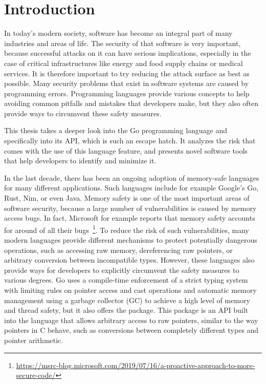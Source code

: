 
\chapter{Introduction}\label{ch:introduction}

In today's modern society, software has become an integral part of many industries and areas of life.
The security of that software is very important, because successful attacks on it can have serious implications,
especially in the case of critical infrastructures like energy and food supply chains or medical services.
It is therefore important to try reducing the attack surface as best as possible.
Many security problems that exist in software systems are caused by programming errors.
Programming languages provide various concepts to help avoiding common pitfalls and mistakes that developers make, but
they also often provide ways to circumvent these safety measures.

This thesis takes a deeper look into the Go programming language and specifically into its \unsafe{} \acrshort{API},
which is such an escape hatch.
It analyzes the risk that comes with the use of this language feature, and presents novel software tools that help
developers to identify and minimize it.


In the last decade, there has been an ongoing adoption of memory-safe languages for many different applications.
Such languages include for example Google's Go, Rust, Nim, or even Java.
Memory safety is one of the most important areas of software security, because a large number of vulnerabilities is
caused by memory access bugs.
In fact, Microsoft for example reports that memory safety accounts for around  of all their
bugs~\footnote{\scriptsize\url{https://msrc-blog.microsoft.com/2019/07/16/a-proactive-approach-to-more-secure-code/}}.
To reduce the risk of such vulnerabilities, many modern languages provide different mechanisms to protect potentially
dangerous operations, such as accessing raw memory, dereferencing raw pointers, or arbitrary conversion between
incompatible types.
However, these languages also provide ways for developers to explicitly circumvent the safety measures to various
degrees.
Go uses a compile-time enforcement of a strict typing system with limiting rules on pointer access and cast operations
and automatic memory management using a garbage collector (\acrshort{GC}) to achieve a high level of memory and thread
safety, but it also offers the \unsafe{} package.
This package is an \acrshort{API} built into the language that allows arbitrary access to raw pointers, similar to the
way pointers in C behave, such as conversions between completely different types and pointer arithmetic.

